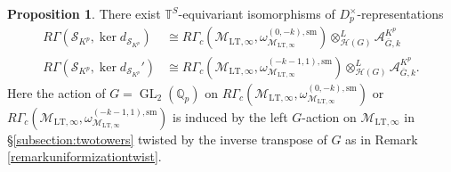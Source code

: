 \documentclass{article}
\theoremstyle{definition}
\newtheorem{proposition}[theorem]{Proposition}
\def\calA{\mathcal{A}}
\def\calH{\mathcal{H}}
\def\calM{\mathcal{M}}
\def\calS{\mathcal{S}}
\def\bbQ{\mathbb{Q}}
\def\bbT{\mathbb{T}}
\DeclareMathOperator{\ox}{\otimes}
\def\isom{\cong}
\DeclareMathOperator{\GL}{GL}
\def\LT{\mathrm{LT}}
\def\sm{\mathrm{sm}}
\def\bar{\overline}
\begin{document}
\begin{proposition}\label{prop:productformula}
    There exist $\bbT^S$-equivariant isomorphisms of $D_p^{\times}$-representations
    \begin{align}\label{eq:RGammakerdSk}
        R\Gamma(\calS_{K^p},\ker d_{\calS_{K^p}})&\isom R\Gamma_c(\calM_{\LT,\infty},\omega_{\calM_{\LT,\infty}}^{(0,-k),\sm})\ox_{\calH(G)}^L\calA^{K^p}_{\bar G,k}\\
        R\Gamma(\calS_{K^p},\ker d_{\calS_{K^p}}')&\isom R\Gamma_c(\calM_{\LT,\infty},\omega_{\calM_{\LT,\infty}}^{(-k-1,1),\sm})\ox_{\calH(G)}^L\calA^{K^p}_{\bar G,k}.
    \end{align}
    Here the action of $G=\GL_2(\bbQ_p)$ on $R\Gamma_c(\calM_{\LT,\infty},\omega_{\calM_{\LT,\infty}}^{(0,-k),\sm})$ or $R\Gamma_c(\calM_{\LT,\infty},\omega_{\calM_{\LT,\infty}}^{(-k-1,1),\sm})$ is induced by the left $G$-action on $\calM_{\LT,\infty}$ in \S\ref{subsection:twotowers} twisted by the inverse transpose of $G$ as in Remark \ref{remarkuniformizationtwist}.
\end{proposition}
\end{document}
